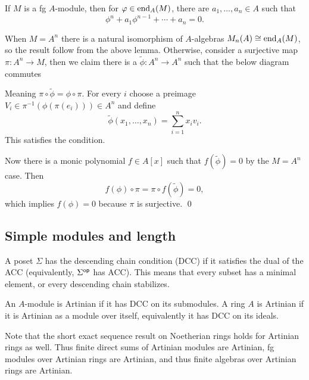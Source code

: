 \eproof

\blemm

    If $M$ is a fg $A$-module, then for $\varphi\in{\rm end}_A(M)$, there are $a_1,\dots,a_n\in A$ such that
    $$ \phi^n + a_1\phi^{n-1} + \cdots + a_n = 0 . $$

\elemm

\bproof

    When $M=A^n$ there is a natural isomorphism of $A$-algebras $M_n(A)\cong{\rm end}_A(M)$, so the result follow from the above lemma.
    Otherwise, consider a surjective map $\pi\colon A^n\to M$, then we claim there is a $\tilde\phi\colon A^n\to A^n$ such that the below diagram commutes

        {\tilde\phi}{\phi}{\pi}{\pi}

    Meaning $\pi\circ\tilde\phi=\phi\circ\pi$.
    For every $i$ choose a preimage $V_i\in\pi^{-1}(\phi(\pi(e_i)))\in A^n$ and define
    $$ \tilde\phi(x_1,\dots,x_n) = \sum_{i=1}^n x_iv_i . $$
    This satisfies the condition.

    Now there is a monic polynomial $f\in A[x]$ such that $f(\tilde\phi)=0$ by the $M=A^n$ case.
    Then
    $$ f(\phi)\circ\pi = \pi\circ f(\tilde\phi) = 0, $$
    which implies $f(\phi)=0$ because $\pi$ is surjective.
    \qed

\eproof

\subsection{Simple modules and length}

\bdefn

    A poset $\Sigma$ has the {\emphcolor descending chain condition} ({\emphcolor DCC}) if it satisfies the dual of the ACC (equivalently, $\Sigma^{\sf op}$ has ACC).
    This means that every subset has a minimal element, or every descending chain stabilizes.

\edefn

\bdefn

    An $A$-module is {\emphcolor Artinian} if it has DCC on its submodules.
    A ring $A$ is {\emphcolor Artinian} if it is Artinian as a module over itself, equivalently it has DCC on its ideals.

\edefn

Note that the short exact sequence result on Noetherian rings holds for Artinian rings as well.
Thus finite direct sums of Artinian modules are Artinian, fg modules over Artinian rings are Artinian, and thus finite algebras over Artinian rings are Artinian.

